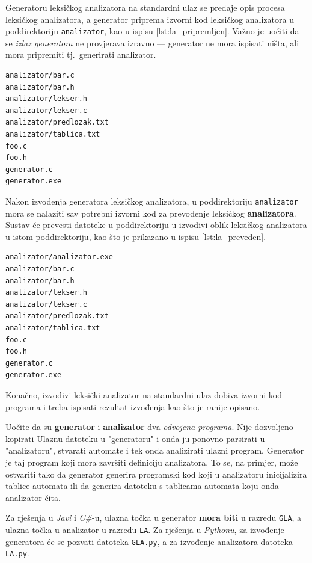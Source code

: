 \documentclass[times, 12pt, utf8]{book}
\begin{document}
Generatoru leksičkog analizatora na standardni ulaz se predaje opis procesa leksičkog analizatora, a generator priprema izvorni kod leksičkog analizatora u poddirektoriju \texttt{analizator}, kao u ispisu \ref{lst:la_pripremljen}.
Važno je uočiti da se \emph{izlaz generatora} ne provjerava izravno --- generator ne mora ispisati ništa, ali mora pripremiti tj.~generirati analizator.

\begin{lstlisting}[caption={Primjer sadržaja korijenskog direktorija nakon izvođenja generatora.},label=lst:la_pripremljen]
analizator/bar.c
analizator/bar.h
analizator/lekser.h
analizator/lekser.c
analizator/predlozak.txt
analizator/tablica.txt
foo.c
foo.h
generator.c
generator.exe
\end{lstlisting}

Nakon izvođenja generatora leksičkog analizatora, u poddirektoriju \texttt{analizator} mora se nalaziti sav potrebni izvorni kod za prevođenje leksičkog \textbf{analizatora}.
Sustav će prevesti datoteke u poddirektoriju u izvodivi oblik leksičkog analizatora u istom poddirektoriju, kao što je prikazano u ispisu \ref{lst:la_preveden}.

\begin{lstlisting}[caption={Primjer sadržaja korijenskog direktorija nakon izvođenja generatora.},label=lst:la_preveden]
analizator/analizator.exe
analizator/bar.c
analizator/bar.h
analizator/lekser.h
analizator/lekser.c
analizator/predlozak.txt
analizator/tablica.txt
foo.c
foo.h
generator.c
generator.exe
\end{lstlisting}

Konačno, izvodivi leksički analizator na standardni ulaz dobiva izvorni kod programa i treba ispisati rezultat izvođenja kao što je ranije opisano.

Uočite da su \textbf{generator} i \textbf{analizator} dva \emph{odvojena programa}.
Nije dozvoljeno kopirati Ulaznu datoteku u "generatoru" i onda ju ponovno parsirati u "analizatoru", stvarati automate i tek onda analizirati ulazni program.
Generator je taj program koji mora završiti definiciju analizatora.
To se, na primjer, može ostvariti tako da generator generira programski kod koji u analizatoru inicijalizira tablice automata ili da generira datoteku s tablicama automata koju onda analizator čita.

Za rješenja u \emph{Javi} i \emph{C\#}-u, ulazna točka u generator \textbf{mora biti} u razredu \texttt{GLA}, a ulazna točka u analizator u razredu \texttt{LA}.
Za rješenja u \emph{Pythonu}, za izvođenje generatora će se pozvati datoteka \texttt{GLA.py}, a za izvođenje analizatora datoteka \texttt{LA.py}.
\end{document}
